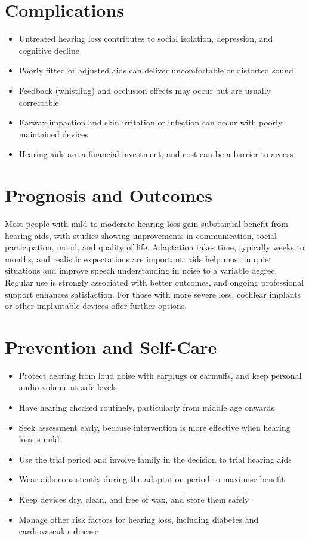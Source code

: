 \section*{Complications}
\begin{itemize}
    \item Untreated hearing loss contributes to social isolation, depression, and cognitive decline
    \item Poorly fitted or adjusted aids can deliver uncomfortable or distorted sound
    \item Feedback (whistling) and occlusion effects may occur but are usually correctable
    \item Earwax impaction and skin irritation or infection can occur with poorly maintained devices
    \item Hearing aids are a financial investment, and cost can be a barrier to access
\end{itemize}

\section*{Prognosis and Outcomes}
Most people with mild to moderate hearing loss gain substantial benefit from hearing aids, with studies showing improvements in communication, social participation, mood, and quality of life. Adaptation takes time, typically weeks to months, and realistic expectations are important: aids help most in quiet situations and improve speech understanding in noise to a variable degree. Regular use is strongly associated with better outcomes, and ongoing professional support enhances satisfaction. For those with more severe loss, cochlear implants or other implantable devices offer further options.

\section*{Prevention and Self-Care}
\begin{itemize}
    \item Protect hearing from loud noise with earplugs or earmuffs, and keep personal audio volume at safe levels
    \item Have hearing checked routinely, particularly from middle age onwards
    \item Seek assessment early, because intervention is more effective when hearing loss is mild
    \item Use the trial period and involve family in the decision to trial hearing aids
    \item Wear aids consistently during the adaptation period to maximise benefit
    \item Keep devices dry, clean, and free of wax, and store them safely
    \item Manage other risk factors for hearing loss, including diabetes and cardiovascular disease
\end{itemize}

